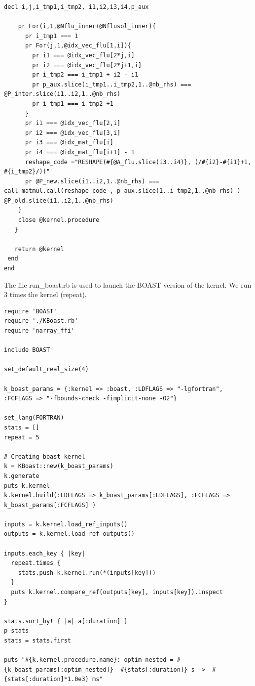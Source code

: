 \documentclass[10pt,twoside]{article}   	%
\begin{document}
\begin{lstlisting}[caption=KBoast.rb]
    decl i,j,i_tmp1,i_tmp2, i1,i2,i3,i4,p_aux

    pr For(i,1,@Nflu_inner+@Nflusol_inner){
      pr i_tmp1 === 1
      pr For(j,1,@idx_vec_flu[1,i]){
        pr i1 === @idx_vec_flu[2*j,i]
        pr i2 === @idx_vec_flu[2*j+1,i]
        pr i_tmp2 === i_tmp1 + i2 - i1
        pr p_aux.slice(i_tmp1..i_tmp2,1..@nb_rhs) === @P_inter.slice(i1..i2,1..@nb_rhs) 
        pr i_tmp1 === i_tmp2 +1
      }
      pr i1 === @idx_vec_flu[2,i]
      pr i2 === @idx_vec_flu[3,i]
      pr i3 === @idx_mat_flu[i]
      pr i4 === @idx_mat_flu[i+1] - 1
      reshape_code ="RESHAPE(#{@A_flu.slice(i3..i4)}, (/#{i2}-#{i1}+1, #{i_tmp2}/))"
      pr @P_new.slice(i1..i2,1..@nb_rhs) === call_matmul.call(reshape_code , p_aux.slice(1..i_tmp2,1..@nb_rhs) ) - @P_old.slice(i1..i2,1..@nb_rhs)
    }
    close @kernel.procedure
   }

   return @kernel
 end
end
\end{lstlisting}


\noindent The file run\_boast.rb is used to launch the BOAST version of the kernel. We run 3 times the kernel (repeat). \\

\begin{lstlisting}[caption=run\_boast.rb]
require 'BOAST'
require './KBoast.rb'
require 'narray_ffi'

include BOAST

set_default_real_size(4)

k_boast_params = {:kernel => :boast, :LDFLAGS => "-lgfortran", :FCFLAGS => "-fbounds-check -fimplicit-none -O2"}  

set_lang(FORTRAN)
stats = []
repeat = 5

# Creating boast kernel
k = KBoast::new(k_boast_params)
k.generate
puts k.kernel
k.kernel.build(:LDFLAGS => k_boast_params[:LDFLAGS], :FCFLAGS => k_boast_params[:FCFLAGS] )
 
inputs = k.kernel.load_ref_inputs()
outputs = k.kernel.load_ref_outputs()

inputs.each_key { |key|
  repeat.times {
    stats.push k.kernel.run(*(inputs[key]))
  }
  puts k.kernel.compare_ref(outputs[key], inputs[key]).inspect
}

stats.sort_by! { |a| a[:duration] }
p stats
stats = stats.first

puts "#{k.kernel.procedure.name}: optim_nested = #{k_boast_params[:optim_nested]}  #{stats[:duration]} s ->  #{stats[:duration]*1.0e3} ms"
\end{lstlisting}
\end{document}
